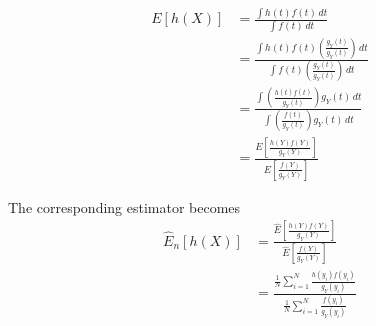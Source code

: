 \begin{equation*} \label{eq:unnormalized}
\begin{split}
E[h(X)] & = \frac{\int h(t)f(t)\,dt}{\int f(t)\,dt} \\
& = \frac{\int h(t)f(t) \left ( \frac{g_Y(t)}{g_Y(t)} \right )\,dt}{{\int f(t)} \left ( \frac{g_Y(t)}{g_Y(t)} \right )\,dt} \\
& = \frac{\int \left ( \frac{h(t)f(t)}{g_Y(t)} \right ) g_Y(t)\,dt}{\int \left ( \frac{f(t)}{g_Y(t)} \right ) g_Y(t)\,dt} \\
& = \frac{E\left [ \frac{h(Y)f(Y)}{g_Y(Y)}\right ]}{E\left [ \frac{f(Y)}{g_Y(Y)}\right ]}
\end{split}
\end{equation*}

The corresponding estimator becomes
\begin{equation*}
\begin{split}
\widehat{E}_n[h(X)] & = \frac{\widehat{E}\left [ \frac{h(Y)f(Y)}{g_Y(Y)}\right ]}{\widehat{E}\left [ \frac{f(Y)}{g_Y(Y)}\right ]} \\
& = \frac{\frac{1}{N}\sum_{i = 1}^{N}\frac{h(y_i)f(y_i)}{g_Y(y_i)}}{\frac{1}{N}\sum_{i = 1}^{N}\frac{f(y_i)}{g_Y(y_i)}} \\
\end{split}
\end{equation*}

